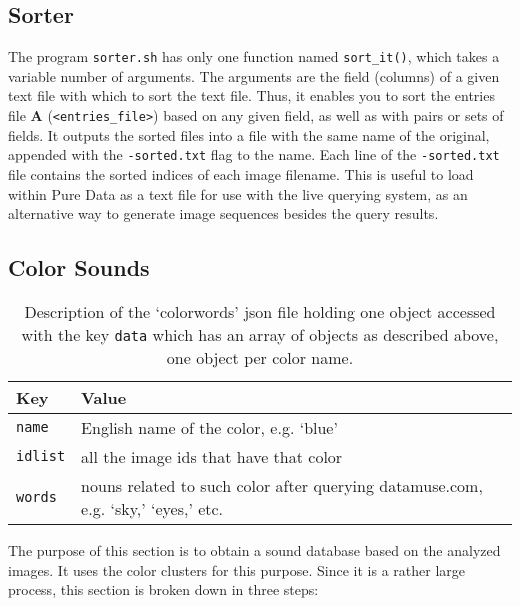 \subsection{Sorter}

The program \texttt{sorter.sh} has only one function named \texttt{sort\_it()}, which takes a variable number of arguments. The arguments are the field (columns) of a given text file with which to sort the text file. Thus, it enables you to sort the entries file \textbf{A} (\texttt{<entries\_file>}) based on any given field, as well as with pairs or sets of fields. It outputs the sorted files into a file with the same name of the original, appended with the \texttt{-sorted.txt} flag to the name. Each line of the \texttt{-sorted.txt} file contains the sorted indices of each image filename. This is useful to load within Pure Data as a text file for use with the live querying system, as an alternative way to generate image sequences besides the query results.



\subsection{Color Sounds}

\begin{table}
\begin{tabular}{l | l}

Key     & Value

\tabularnewline
\hline


\texttt{name}    & English name of the color, e.g. `blue'

\tabularnewline
\hline

\texttt{idlist}  & all the image ids that have that color

\tabularnewline
\hline

\texttt{words}   & nouns related to such color after querying datamuse.com, e.g. `sky,' `eyes,' etc. 

\end{tabular}
\label{tab:colorwords}
\caption{Description of the `colorwords' \gls{json} file holding one object accessed with the key \texttt{data} which has an array of objects as described above, one object per color name.}
\end{table}

The purpose of this section is to obtain a sound database based on the analyzed images. It uses the color clusters for this purpose. Since it is a rather large process, this section is broken down in three steps:



